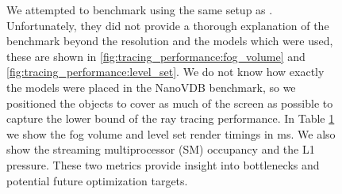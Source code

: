 \begin{figure}[H]
{\begin{tabularx}{\textwidth}{|c|X|X|X|X|X|X|}
            \hline
        \end{tabularx}
        \label{tab:tracing_performance:numbers}
    }
    \caption{We attempted to benchmark using the same setup as \cite{NanoVDBBenchmark}. Unfortunately, they did not provide a thorough explanation of the benchmark beyond the resolution and the models which were used, these are shown in \ref{fig:tracing_performance:fog_volume} and \ref{fig:tracing_performance:level_set}. We do not know how exactly the models were placed in the NanoVDB benchmark, so we positioned the objects to cover as much of the screen as possible to capture the lower bound of the ray tracing performance. In Table \ref{tab:tracing_performance:numbers} we show the fog volume and level set render timings in ms. We also show the streaming multiprocessor (SM) occupancy and the L1 pressure. These two metrics provide insight into bottlenecks and potential future optimization targets.}
\end{figure}
